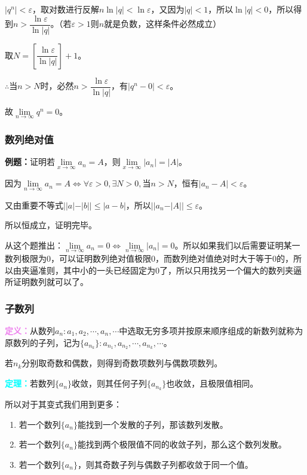 \documentclass[UTF8, 12pt]{ctexart}
\begin{document}
$\vert q^n\vert<\varepsilon$，取对数进行反解$n\ln\vert q\vert<\ln\varepsilon$，又因为$\vert q\vert<1$，所以$\ln\vert q\vert<0$，所以得到$n>\dfrac{\ln\varepsilon}{\ln\vert q\vert}$。（若$\varepsilon>1$则$n$就是负数，这样条件必然成立）

取$N=\left[\dfrac{\ln\varepsilon}{\ln\vert q\vert}\right]+1$。

$\therefore$当$n>N$时，必然$n>\dfrac{\ln\varepsilon}{\ln\vert q\vert}$，有$\vert q^n-0\vert<\varepsilon$。

故$\lim\limits_{n\to\infty}q^n=0$。

\subsubsection{数列绝对值}

\textbf{例题：}证明若$\lim\limits_{x\to\infty}a_n=A$，则$\lim\limits_{x\to\infty}\vert a_n\vert=\vert A\vert$。

因为$\lim\limits_{n\to\infty}a_n=A\Leftrightarrow\forall\varepsilon>0,\exists N>0,\text{当}n>N$，恒有$\vert a_n-A\vert<\varepsilon$。

又由重要不等式$\vert\vert a\vert-\vert b\vert\vert\leqslant\vert a-b\vert$，所以$\vert\vert a_n-\vert A\vert\vert\leqslant\varepsilon$。

所以恒成立，证明完毕。

从这个题推出：$\lim\limits_{n\to\infty}a_n=0\Leftrightarrow\lim\limits_{n\to\infty}\vert a_n\vert=0$。所以如果我们以后需要证明某一数列极限为0，可以证明数列绝对值极限0，而数列绝对值绝对时大于等于0的，所以由夹逼准则，其中小的一头已经固定为0了，所以只用找另一个偏大的数列夹逼所证明数列就可以了。

\subsubsection{子数列}

\textcolor{violet}{\textbf{定义：}}从数列${a_n}:a_1,a_2,\cdots,a_n,\cdots$中选取无穷多项并按原来顺序组成的新数列就称为原数列的子列，记为$\{a_{n_k}\}:a_{n_1},a_{n_2},\cdots,a_{n_k},\cdots$。

若$n_k$分别取奇数和偶数，则得到奇数项数列与偶数项数列。

\textcolor{aqua}{\textbf{定理：}}若数列$\{a_n\}$收敛，则其任何子列$\{a_{n_k}\}$也收敛，且极限值相同。

所以对于其变式我们用到更多：

\begin{enumerate}
    \item 若一个数列$\{a_n\}$能找到一个发散的子列，那该数列发散。
    \item 若一个数列$\{a_n\}$能找到两个极限值不同的收敛子列，那么这个数列发散。
    \item 若一个数列$\{a_n\}$，则其奇数子列与偶数子列都收敛于同一个值。
\end{enumerate}
\end{document}
